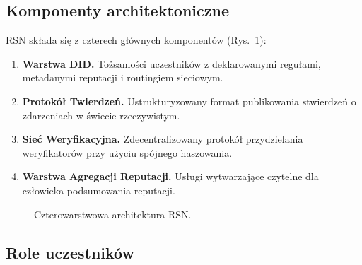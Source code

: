 \documentclass[11pt,a4paper,twocolumn]{article}
\begin{document}
\subsection{Komponenty architektoniczne}

RSN składa się z czterech głównych komponentów (Rys.~\ref{fig:architecture}):
\begin{enumerate}[nosep]
\item \textbf{Warstwa DID.} Tożsamości uczestników z deklarowanymi regułami, metadanymi reputacji i routingiem sieciowym.
\item \textbf{Protokół Twierdzeń.} Ustrukturyzowany format publikowania stwierdzeń o zdarzeniach w świecie rzeczywistym.
\item \textbf{Sieć Weryfikacyjna.} Zdecentralizowany protokół przydzielania weryfikatorów przy użyciu spójnego haszowania.
\item \textbf{Warstwa Agregacji Reputacji.} Usługi wytwarzające czytelne dla człowieka podsumowania reputacji.
\end{enumerate}

\begin{figure}[ht]
\centering
{}
\caption{Czterowarstwowa architektura RSN.}
\label{fig:architecture}
\end{figure}

\subsection{Role uczestników}
\end{document}
